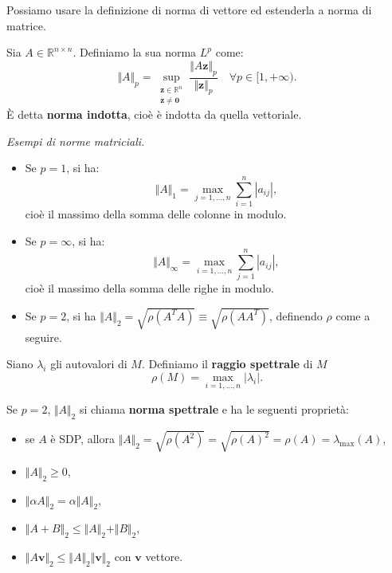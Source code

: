 Possiamo usare la definizione di norma di vettore ed estenderla a norma di matrice.
\begin{definition}
Sia $\displaystyle A\in \mathbb{R}^{n\times n}$. Definiamo la sua norma $L^p$ come:
\begin{equation*}
\Vert A\Vert _{p} =\sup _{\substack{\mathbf{z} \in \mathbb{R}^{n} \\ \mathbf{z} \neq \mathbf{0}} } \frac{\Vert A\mathbf{z}\Vert _{p}}{\Vert \mathbf{z}\Vert _{p}} \quad \forall p\in [ 1,+\infty ).
\end{equation*}
È detta \textbf{norma indotta}, cioè è indotta da quella vettoriale.
\end{definition}
\textit{Esempi di norme matriciali.}
\begin{itemize}
    \item Se $p=1$, si ha:
    \begin{equation*}
        \Vert A\Vert _{1} =\max_{j=1,\dotsc,n}\sum\limits ^{n}_{i=1} |a_{ij}|,
    \end{equation*}
    cioè il massimo della somma delle colonne in modulo.
    \item Se $p=\infty$, si ha:
    \begin{equation*}
      \Vert A\Vert _{\infty } =\max_{i=1,\dotsc,n}\sum\limits ^{n}_{j=1} |a_{ij}|,
    \end{equation*}
    cioè il massimo della somma delle righe in modulo.
    \item Se $p=2$, si ha $\Vert A\Vert _{2} =\sqrt{\rho \left( A^{T} A\right)} \equiv \sqrt{\rho \left( A A^{T}\right)}$, definendo $\rho$ come a seguire.
\end{itemize}
\begin{definition}
Siano $\lambda _{i}$ gli autovalori di $M$. Definiamo il \textbf{raggio spettrale} di $\displaystyle M$
\begin{equation*}
\rho (M) =\max_{i=1,\dotsc ,n} |\lambda _{i} |.
\end{equation*}
\end{definition}
Se $\displaystyle p=2$, $\Vert A\Vert _{2}$ si chiama \textbf{norma spettrale} e ha le seguenti proprietà:
\begin{itemize}
\item se $A$ è SDP, allora $\Vert A\Vert _{2} =\sqrt{\rho \left( A^{2}\right)} =\sqrt{\rho (A)^{2}} =\rho (A) =\lambda _{\text{max}}(A)$,
\item $\Vert A\Vert _{2} \geqslant 0$,
\item $\Vert \alpha A\Vert _{2} =\alpha \Vert A\Vert _{2}$,
\item $\Vert A+B\Vert _{2} \leqslant \Vert A\Vert _{2} +\Vert B\Vert _{2}$,
\item $\Vert A\mathbf{v}\Vert _{2} \leqslant \Vert A\Vert _{2}\Vert \mathbf{v}\Vert _{2}$ con $\mathbf{v}$ vettore.
\end{itemize}

